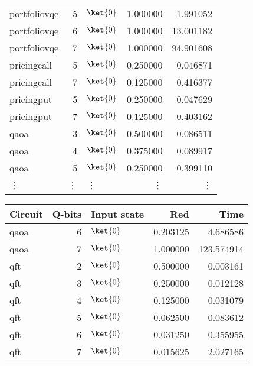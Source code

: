 \begin{table}
{{\begin{minipage}[t]{0.5\textwidth}
\begin{tabular}{lrlrr}
    portfoliovqe & 5 & $\ket{0}$ & 1.000000 & 1.991052 \\
    portfoliovqe & 6 & $\ket{0}$ & 1.000000 & 13.001182 \\
    portfoliovqe & 7 & $\ket{0}$ & 1.000000 & 94.901608 \\
    \midrule
    pricingcall & 5 & $\ket{0}$ & 0.250000 & 0.046871 \\
    pricingcall & 7 & $\ket{0}$ & 0.125000 & 0.416377 \\
    \midrule
    pricingput & 5 & $\ket{0}$ & 0.250000 & 0.047629 \\
    pricingput & 7 & $\ket{0}$ & 0.125000 & 0.403162 \\
    \midrule
    qaoa & 3 & $\ket{0}$ & 0.500000 & 0.086511 \\
    qaoa & 4 & $\ket{0}$ & 0.375000 & 0.089917 \\
    qaoa & 5 & $\ket{0}$ & 0.250000 & 0.399110 \\
    \vdots & \vdots & \vdots & \vdots & \vdots
    \end{tabular}
    \end{minipage}\hfill
    \begin{minipage}[t]{0.5\textwidth}
    \tiny
    \centering
    \begin{tabular}{lrlrr}
    \toprule
    Circuit & Q-bits & Input state & Red & Time \\
    \midrule
    \midrule
    qaoa & 6 & $\ket{0}$ & 0.203125 & 4.686586 \\
    qaoa & 7 & $\ket{0}$ & 1.000000 & 123.574914 \\
    \midrule
    qft & 2 & $\ket{0}$ & 0.500000 & 0.003161 \\
    qft & 3 & $\ket{0}$ & 0.250000 & 0.012128 \\
    qft & 4 & $\ket{0}$ & 0.125000 & 0.031079 \\
    qft & 5 & $\ket{0}$ & 0.062500 & 0.083612 \\
    qft & 6 & $\ket{0}$ & 0.031250 & 0.355955 \\
    qft & 7 & $\ket{0}$ & 0.015625 & 2.027165 \\
    \midrule

\end{tabular}
\end{minipage}}}
\end{table}
